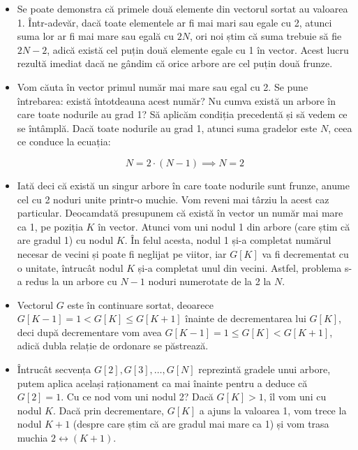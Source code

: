 \begin{itemize}

\item Se poate demonstra că primele două elemente din vectorul sortat au
  valoarea 1. Într-adevăr, dacă toate elementele ar fi mai mari sau egale cu
  2, atunci suma lor ar fi mai mare sau egală cu $2N$, ori noi știm că suma
  trebuie să fie $2N-2$, adică există cel puțin două elemente egale cu 1 în
  vector. Acest lucru rezultă imediat dacă ne gândim că orice arbore are cel
  puțin două frunze.

\item Vom căuta în vector primul număr mai mare sau egal cu 2. Se pune
  întrebarea: există întotdeauna acest număr? Nu cumva există un arbore în
  care toate nodurile au grad 1? Să aplicăm condiția precedentă și să vedem ce
  se întâmplă. Dacă toate nodurile au grad 1, atunci suma gradelor este $N$,
  ceea ce conduce la ecuația:

  \begin{equation}
    N = 2 \cdot (N - 1) \implies N = 2
  \end{equation}

\item Iată deci că există un singur arbore în care toate nodurile sunt frunze,
  anume cel cu 2 noduri unite printr-o muchie. Vom reveni mai târziu la acest
  caz particular. Deocamdată presupunem că există în vector un număr mai mare
  ca 1, pe poziția $K$ în vector. Atunci vom uni nodul 1 din arbore (care știm
  că are gradul 1) cu nodul $K$. În felul acesta, nodul 1 și-a completat
  numărul necesar de vecini și poate fi neglijat pe viitor, iar $G[K]$ va fi
  decrementat cu o unitate, întrucât nodul $K$ și-a completat unul din
  vecini. Astfel, problema s-a redus la un arbore cu $N-1$ noduri numerotate
  de la 2 la $N$.

\item Vectorul $G$ este în continuare sortat, deoarece $G[K-1] = 1 < G[K] \leq
  G[K+1]$ înainte de decrementarea lui $G[K]$, deci după decrementare vom avea
  $G[K-1] = 1 \leq G[K] < G[K+1]$, adică dubla relație de ordonare se
  păstrează.

\item Întrucât secvența $G[2], G[3], \dots, G[N]$ reprezintă gradele unui
  arbore, putem aplica același raționament ca mai înainte pentru a deduce că
  $G[2]=1$. Cu ce nod vom uni nodul 2? Dacă $G[K] > 1$, îl vom uni cu nodul
  $K$. Dacă prin decrementare, $G[K]$ a ajuns la valoarea 1, vom trece la
  nodul $K+1$ (despre care știm că are gradul mai mare ca 1) și vom trasa
  muchia $2 \leftrightarrow (K+1)$.


\end{itemize}
